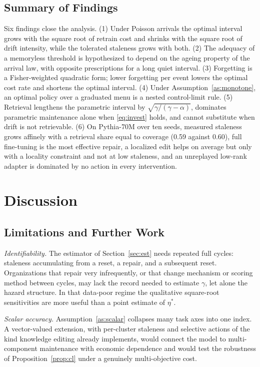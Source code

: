 \documentclass[journal]{IEEEtran}
\begin{document}
\subsection{Summary of Findings}
Six findings close the analysis. (1) Under Poisson arrivals the optimal interval grows with the square root of retrain cost and shrinks with the square root of drift intensity, while the tolerated staleness grows with both. (2) The adequacy of a memoryless threshold is hypothesized to depend on the ageing property of the arrival law, with opposite prescriptions for a long quiet interval. (3) Forgetting is a Fisher-weighted quadratic form; lower forgetting per event lowers the optimal cost rate and shortens the optimal interval. (4) Under Assumption~\ref{as:monotone}, an optimal policy over a graduated menu is a nested control-limit rule. (5) Retrieval lengthens the parametric interval by $\sqrt{\gamma/(\gamma-\alpha)}$, dominates parametric maintenance alone when \eqref{eq:invest} holds, and cannot substitute when drift is not retrievable. (6) On Pythia-70M over ten seeds, measured staleness grows affinely with a retrieval share equal to coverage (0.59 against 0.60), full fine-tuning is the most effective repair, a localized edit helps on average but only with a locality constraint and not at low staleness, and an unreplayed low-rank adapter is dominated by no action in every intervention.

\section{Discussion}\label{sec:disc}
\subsection{Limitations and Further Work}
\emph{Identifiability.} The estimator of Section~\ref{sec:est} needs repeated full cycles: staleness accumulating from a reset, a repair, and a subsequent reset. Organizations that repair very infrequently, or that change mechanism or scoring method between cycles, may lack the record needed to estimate $\gamma$, let alone the hazard structure. In that data-poor regime the qualitative square-root sensitivities are more useful than a point estimate of $\eta^\ast$.

\emph{Scalar accuracy.} Assumption~\ref{as:scalar} collapses many task axes into one index. A vector-valued extension, with per-cluster staleness and selective actions of the kind knowledge editing already implements, would connect the model to multi-component maintenance with economic dependence \cite{dekker1997} and would test the robustness of Proposition~\ref{prop:cl} under a genuinely multi-objective cost.
\end{document}
